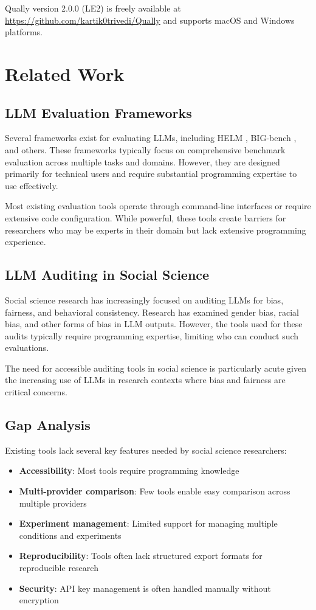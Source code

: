 \documentclass[11pt,a4paper]{article}
\begin{document}
Qually version 2.0.0 (LE2) is freely available at \url{https://github.com/kartik0trivedi/Qually} and supports macOS and Windows platforms.

\section{Related Work}
\label{sec:related_work}

\subsection{LLM Evaluation Frameworks}

Several frameworks exist for evaluating LLMs, including HELM \cite{github}, BIG-bench \cite{github}, and others. These frameworks typically focus on comprehensive benchmark evaluation across multiple tasks and domains. However, they are designed primarily for technical users and require substantial programming expertise to use effectively.

Most existing evaluation tools operate through command-line interfaces or require extensive code configuration. While powerful, these tools create barriers for researchers who may be experts in their domain but lack extensive programming experience.

\subsection{LLM Auditing in Social Science}

Social science research has increasingly focused on auditing LLMs for bias, fairness, and behavioral consistency. Research has examined gender bias, racial bias, and other forms of bias in LLM outputs. However, the tools used for these audits typically require programming expertise, limiting who can conduct such evaluations.

The need for accessible auditing tools in social science is particularly acute given the increasing use of LLMs in research contexts where bias and fairness are critical concerns.

\subsection{Gap Analysis}

Existing tools lack several key features needed by social science researchers:
\begin{itemize}
    \item \textbf{Accessibility}: Most tools require programming knowledge
    \item \textbf{Multi-provider comparison}: Few tools enable easy comparison across multiple providers
    \item \textbf{Experiment management}: Limited support for managing multiple conditions and experiments
    \item \textbf{Reproducibility}: Tools often lack structured export formats for reproducible research
    \item \textbf{Security}: API key management is often handled manually without encryption
\end{itemize}
\end{document}
